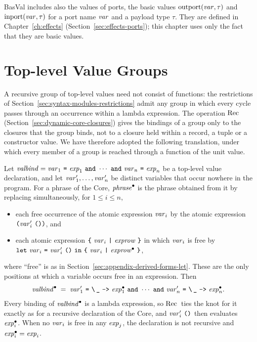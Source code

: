 BasVal includes also the values of ports, the basic values
$\mathrm{outport}(\mathit{var},\tau)$ and $\mathrm{inport}(\mathit{var},\tau)$ for a port name $\mathit{var}$
and a payload type $\tau$. They are defined in Chapter~\ref{ch:effects}
(Section~\ref{sec:effects-ports}); this chapter uses only the fact that they
are basic values. %

\section{Top-level Value Groups}\label{sec:dynamic-modules-groups}

A recursive group of top-level values need not consist of functions: the
restrictions of Section~\ref{sec:syntax-modules-restrictions} admit any group
in which every cycle passes through an occurrence within a lambda expression.
The operation $\mathrm{Rec}\,$ (Section~\ref{sec:dynamic-core-closures}) gives the
bindings of a group only to the closures that the group binds, not to a
closure held within a record, a tuple or a constructor value. We have
therefore adopted the following translation, under which every member of a
group is reached through a function of the unit value.

Let $\valbind=\var_1\ \kw{=}\ \expm_1\ \kw{and}\ \cdots\ \kw{and}\ \var_n\
\kw{=}\ \expm_n$ be a top-level value declaration, and let
$\mathit{var}'_1,\ldots,\mathit{var}'_n$ be distinct variables that occur nowhere in the
program. For a phrase of the Core, $\mathit{phrase}^{\bullet}$ is the phrase
obtained from it by replacing simultaneously, for $1\leq i\leq n$,
\begin{itemize}
\item each free occurrence of the atomic expression $\mathit{var}_i$ by the atomic
  expression $\textnormal{\texttt{(}}\mathit{var}'_i\ \textnormal{\texttt{()}}\textnormal{\texttt{)}}$, and
\item each atomic expression $\kw{\kwlb}\ \var_i\ \kw{|}\ \exprow\
  \kw{\kwrb}$ in which $\mathit{var}_i$ is free by
  $\kw{let}\ \var_i\ \kw{=}\ \var'_i\ \kw{()}\ \kw{in}\
  \kw{\kwlb}\ \var_i\ \kw{|}\ \dmthunk{\exprow}\ \kw{\kwrb}$,
\end{itemize}
where ``free'' is as in Section~\ref{sec:appendix-derived-forms-let}. These are
the only positions at which a variable occurs free in an expression. Then
\[
  \dmthunk{\valbind}\;=\;
  \var'_1\ \kw{=}\ \kw{\textbackslash}\,\kw{\_}\ \kw{->}\ \dmthunk{\expm_1}\
  \kw{and}\ \cdots\ \kw{and}\
  \var'_n\ \kw{=}\ \kw{\textbackslash}\,\kw{\_}\ \kw{->}\ \dmthunk{\expm_n}.
\]
Every binding of $\mathit{valbind}^{\bullet}$ is a lambda expression, so $\mathrm{Rec}\,$ ties
the knot for it exactly as for a recursive declaration of the Core, and
$\mathit{var}'_i\ \textnormal{\texttt{()}}$ then evaluates $\mathit{exp}_i^{\bullet}$. When no $\mathit{var}_i$ is
free in any $\mathit{exp}_j$, the declaration is not recursive and
$\mathit{exp}_i^{\bullet}=\mathit{exp}_i$.

